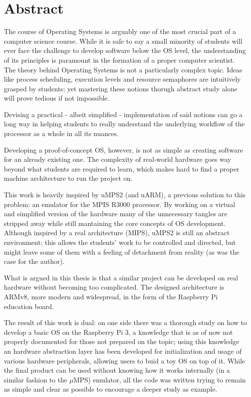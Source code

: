 \documentclass[12pt,a4paper,openright,twoside]{report}
\begin{document}
\chapter*{Abstract}                 %
The course of Operating Systems is arguably one of the most crucial part of 
a computer science course. While it is safe to say a small minority of students
will ever face the challenge to develop software below the OS level, the 
understanding of its principles is paramount in the formation of a proper computer
scientist.
The theory behind Operating Systems is not a particularly complex topic. Ideas 
like process scheduling, execution levels and resource semaphores are intuitively
grasped by students; yet mastering these notions thorugh abstract study alone
will prove tedious if not impossible. 

Devising a practical - albeit simplified - implementation of said notions can
go a long way in helping students to really understand the underlying workflow
of the processor as a whole in all its nuances. 

Developing a proof-of-concept OS, however, is not as simple as creating software for
an already existing one. The complexity of real-world hardware
 goes way beyond what students are required to learn, which makes hard to
 find a proper machine architecture to run the project on.

This work is heavily inspired by uMPS2 (and uARM), a previous solution to this problem:
 an emulator for the MPIS R3000 processor. By working on a virtual and simplified
 version of the hardware many of the unnecessary tangles are stripped away while
 still mantaining the core concepts of OS development.
Although inspired by a real architecture (MIPS), uMPS2 is still an abstract 
environment; this allows the students' work to be controlled and directed,
 but might leave some of them with a feeling of detachment from reality
 (as was the case for the author).

What is argued in this thesis is that a similar project can be developed
on real hardware without becoming too complicated. The designed architecture
is ARMv8, more modern and widespread, in the form of the Raspberry Pi education
board.

The result of this work is dual: on one side there was a thorough study on
how to develop a basic OS on the Raspberry Pi 3, a knowledge that is
as of now not properly documented for those not prepared on the topic; using
this knowledge an hardware abstraction layer has been developed for 
initialization and usage of various hardware peripherals, allowing users
to buid a toy OS on top of it.
While the final product can be used without knowing how it works internally 
(in a similar fashion to the $\mu$MPS) emulator, all the code was written 
trying to remain as simple and clear as possible to encourage a deeper study
as example.
\end{document}
